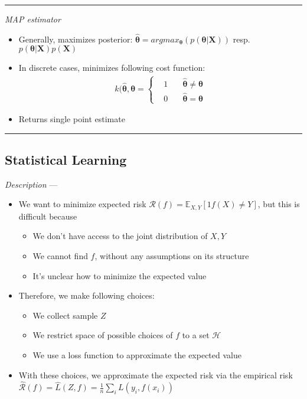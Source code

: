 {\color{lightgray}\hrule height 0.001mm}

\emph{MAP estimator}
\begin{itemize}
    \item Generally, maximizes posterior: $\hat{\boldsymbol{\theta}} = argmax_{\boldsymbol{\theta}}( p(\boldsymbol{\theta}|\boldsymbol{X}) )$ resp. $p(\boldsymbol{\theta}|\boldsymbol{X}) p(\boldsymbol{X})$ 
    \item In discrete cases, minimizes following cost function: 
    \begin{align*}
        k(\hat{\boldsymbol{\theta}},\boldsymbol{\theta}  = 
        \left\{
            \begin{aligned}
                 & 1 \quad & \hat{\boldsymbol{\theta}} \neq \boldsymbol{\theta} \\
                 & 0 \quad & \hat{\boldsymbol{\theta}} = \boldsymbol{\theta}
            \end{aligned}
        \right.
    \end{align*}
    \item Returns single point estimate
\end{itemize}

{\color{black}\hrule height 0.001mm}

\subsection*{Statistical Learning}
\emph{Description} --- 
\begin{itemize}
    \item We want to minimize expected risk $\mathcal{R}(f) = \mathbb{E}_{X,Y}[1{f(X) \neq Y}]$, but this is difficult because
    \begin{itemize}
        \item We don't have access to the joint distribution of $X,Y$
        \item We cannot find $f$, without any assumptions on its structure
        \item It's unclear how to minimize the expected value
    \end{itemize}
    \item Therefore, we make following choices:
    \begin{itemize}
        \item We collect sample $Z$
        \item We restrict space of possible choices of $f$ to a set $\mathcal{H}$
        \item We use a loss function to approximate the expected value
    \end{itemize}
    \item With these choices, we approximate the expected risk via the empirical risk $\hat{\mathcal{R}}(f) = \hat{L}(Z,f) = \frac{1}{n} \sum_i L(y_i, f(x_i))$
\end{itemize}